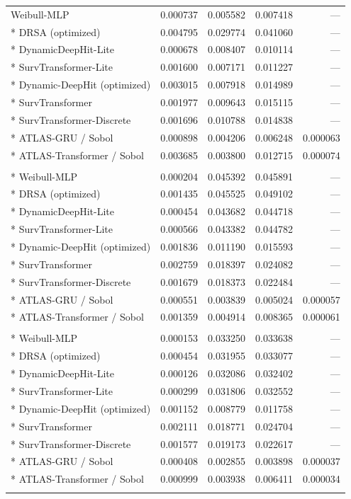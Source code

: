 \begin{longtable}{lrrrr}
Weibull-MLP & 0.000737 & 0.005582 & 0.007418 & --- \\*
DRSA (optimized) & 0.004795 & 0.029774 & 0.041060 & --- \\*
DynamicDeepHit-Lite & 0.000678 & 0.008407 & 0.010114 & --- \\*
SurvTransformer-Lite & 0.001600 & 0.007171 & 0.011227 & --- \\*
Dynamic-DeepHit (optimized) & 0.003015 & 0.007918 & 0.014989 & --- \\*
SurvTransformer & 0.001977 & 0.009643 & 0.015115 & --- \\*
SurvTransformer-Discrete & 0.001696 & 0.010788 & 0.014838 & --- \\*
ATLAS-GRU / Sobol & 0.000898 & 0.004206 & 0.006248 & 0.000063 \\*
ATLAS-Transformer / Sobol & 0.003685 & 0.003800 & 0.012715 & 0.000074 \\
\addlinespace
\multicolumn{5}{l}{\textit{Death B cumulative incidence, landmark $L=10$}}\\*
Weibull-MLP & 0.000204 & 0.045392 & 0.045891 & --- \\*
DRSA (optimized) & 0.001435 & 0.045525 & 0.049102 & --- \\*
DynamicDeepHit-Lite & 0.000454 & 0.043682 & 0.044718 & --- \\*
SurvTransformer-Lite & 0.000566 & 0.043382 & 0.044782 & --- \\*
Dynamic-DeepHit (optimized) & 0.001836 & 0.011190 & 0.015593 & --- \\*
SurvTransformer & 0.002759 & 0.018397 & 0.024082 & --- \\*
SurvTransformer-Discrete & 0.001679 & 0.018373 & 0.022484 & --- \\*
ATLAS-GRU / Sobol & 0.000551 & 0.003839 & 0.005024 & 0.000057 \\*
ATLAS-Transformer / Sobol & 0.001359 & 0.004914 & 0.008365 & 0.000061 \\
\addlinespace
\multicolumn{5}{l}{\textit{Death B cumulative incidence, landmark $L=20$}}\\*
Weibull-MLP & 0.000153 & 0.033250 & 0.033638 & --- \\*
DRSA (optimized) & 0.000454 & 0.031955 & 0.033077 & --- \\*
DynamicDeepHit-Lite & 0.000126 & 0.032086 & 0.032402 & --- \\*
SurvTransformer-Lite & 0.000299 & 0.031806 & 0.032552 & --- \\*
Dynamic-DeepHit (optimized) & 0.001152 & 0.008779 & 0.011758 & --- \\*
SurvTransformer & 0.002111 & 0.018771 & 0.024704 & --- \\*
SurvTransformer-Discrete & 0.001577 & 0.019173 & 0.022617 & --- \\*
ATLAS-GRU / Sobol & 0.000408 & 0.002855 & 0.003898 & 0.000037 \\*
ATLAS-Transformer / Sobol & 0.000999 & 0.003938 & 0.006411 & 0.000034 \\
\addlinespace
\end{longtable}
\endgroup
